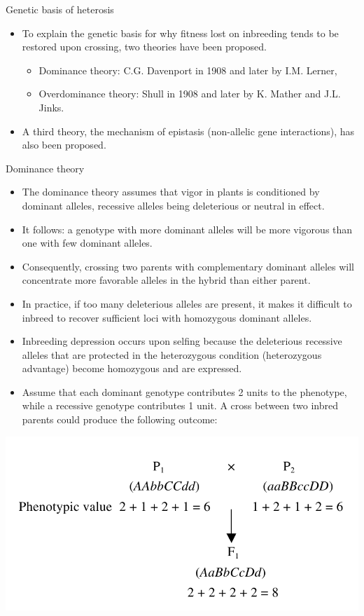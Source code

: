 \documentclass[11pt,dvipsnames,ignorenonframetext,aspectratio=169]{beamer}
\providecommand{\tightlist}{%
  \setlength{\itemsep}{0pt}\setlength{\parskip}{0pt}}
\begin{document}
\begin{frame}{Genetic basis of heterosis}
\protect\hypertarget{genetic-basis-of-heterosis}{}
\begin{itemize}
\tightlist
\item
  To explain the genetic basis for why fitness lost on inbreeding tends
  to be restored upon crossing, two theories have been proposed.

  \begin{itemize}
  \tightlist
  \item
    Dominance theory: C.G. Davenport in 1908 and later by I.M. Lerner,
  \item
    Overdominance theory: Shull in 1908 and later by K. Mather and J.L.
    Jinks.
  \end{itemize}
\item
  A third theory, the mechanism of epistasis (non-allelic gene
  interactions), has also been proposed.
\end{itemize}
\end{frame}

\begin{frame}{Dominance theory}
\protect\hypertarget{dominance-theory}{}
\footnotesize

\begin{itemize}
\tightlist
\item
  The dominance theory assumes that vigor in plants is conditioned by
  dominant alleles, recessive alleles being deleterious or neutral in
  effect.
\item
  It follows: a genotype with more dominant alleles will be more
  vigorous than one with few dominant alleles.
\item
  Consequently, crossing two parents with complementary dominant alleles
  will concentrate more favorable alleles in the hybrid than either
  parent.
\item
  In practice, if too many deleterious alleles are present, it makes it
  difficult to inbreed to recover sufficient loci with homozygous
  dominant alleles.
\item
  Inbreeding depression occurs upon selfing because the deleterious
  recessive alleles that are protected in the heterozygous condition
  (heterozygous advantage) become homozygous and are expressed.
\item
  Assume that each dominant genotype contributes 2 units to the
  phenotype, while a recessive genotype contributes 1 unit. A cross
  between two inbred parents could produce the following outcome:
\end{itemize}

\begin{center}\includegraphics[width=0.35\linewidth]{../images/dominance_theory} \end{center}
\end{frame}
\end{document}
